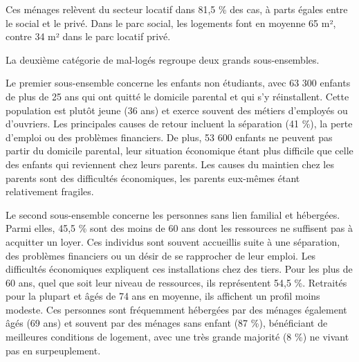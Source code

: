 \documentclass[a4paper, 12pt]{report}
\begin{document}
Ces ménages relèvent du secteur locatif dans 81,5 \% des cas, à parts égales entre le social et le privé. Dans le parc social, les logements font en moyenne 65 m², contre 34 m² dans le parc locatif privé.

La deuxième catégorie de mal-logés regroupe deux grands sous-ensembles.

Le premier sous-ensemble concerne les enfants non étudiants, avec 63 300 enfants de plus de 25 ans qui ont quitté le domicile parental et qui s’y réinstallent. Cette population est plutôt jeune (36 ans) et exerce souvent des métiers d’employés ou d’ouvriers. Les principales causes de retour incluent la séparation (41 \%), la perte d’emploi ou des problèmes financiers. De plus, 53 600 enfants ne peuvent pas partir du domicile parental, leur situation économique étant plus difficile que celle des enfants qui reviennent chez leurs parents. Les causes du maintien chez les parents sont des difficultés économiques, les parents eux-mêmes étant relativement fragiles.

Le second sous-ensemble concerne les personnes sans lien familial et hébergées. Parmi elles, 45,5 \% sont des moins de 60 ans dont les ressources ne suffisent pas à acquitter un loyer. Ces individus sont souvent accueillis suite à une séparation, des problèmes financiers ou un désir de se rapprocher de leur emploi. Les difficultés économiques expliquent ces installations chez des tiers. Pour les plus de 60 ans, quel que soit leur niveau de ressources, ils représentent 54,5 \%. Retraités pour la plupart et âgés de 74 ans en moyenne, ils affichent un profil moins modeste. Ces personnes sont fréquemment hébergées par des ménages également âgés (69 ans) et souvent par des ménages sans enfant (87 \%), bénéficiant de meilleures conditions de logement, avec une très grande majorité (8 \%) ne vivant pas en surpeuplement.
\end{document}
